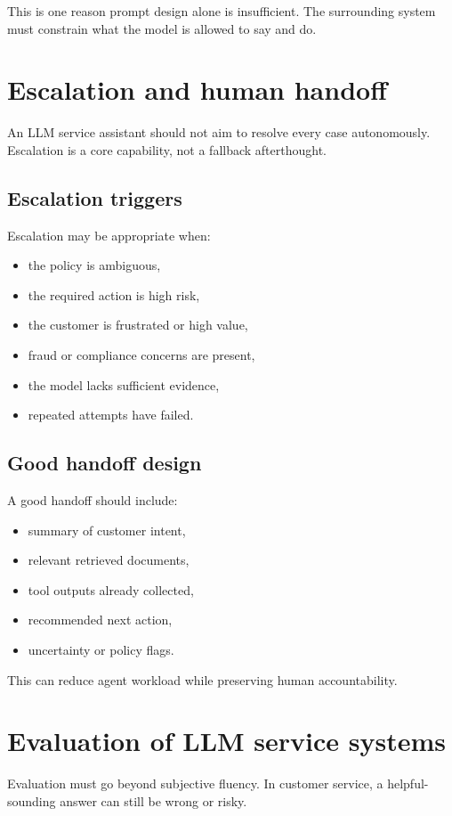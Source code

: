 This is one reason prompt design alone is insufficient.
The surrounding system must constrain what the model is allowed to say and do.

\section{Escalation and human handoff}
An LLM service assistant should not aim to resolve every case autonomously.
Escalation is a core capability, not a fallback afterthought.

\subsection{Escalation triggers}
Escalation may be appropriate when:
\begin{itemize}
  \item the policy is ambiguous,
  \item the required action is high risk,
  \item the customer is frustrated or high value,
  \item fraud or compliance concerns are present,
  \item the model lacks sufficient evidence,
  \item repeated attempts have failed.
\end{itemize}

\subsection{Good handoff design}
A good handoff should include:
\begin{itemize}
  \item summary of customer intent,
  \item relevant retrieved documents,
  \item tool outputs already collected,
  \item recommended next action,
  \item uncertainty or policy flags.
\end{itemize}

This can reduce agent workload while preserving human accountability.

\section{Evaluation of LLM service systems}
Evaluation must go beyond subjective fluency.
In customer service, a helpful-sounding answer can still be wrong or risky.

